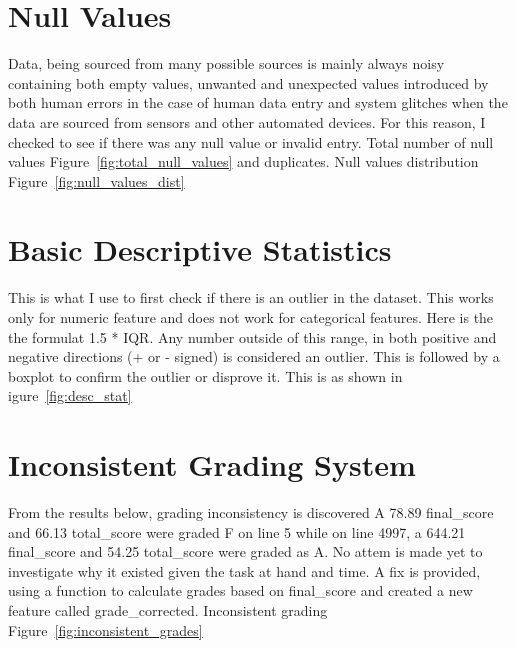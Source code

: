 \section{Null Values}
Data, being sourced from many possible sources is mainly always noisy containing both empty values, unwanted and unexpected values introduced by both human errors in the case of human data entry and system glitches when the data are sourced from sensors and other automated devices. For this reason, I checked to see if there was any null value or invalid entry. Total number of null values Figure~\ref{fig:total_null_values} and duplicates.  Null values distribution Figure~\ref{fig:null_values_dist}

\section{Basic Descriptive Statistics}
This is what I use to first check if there is an outlier in the dataset. This works only for numeric feature and does not work for categorical features. Here is the the formulat 1.5 * IQR. Any number outside of this range, in both positive and negative directions (+ or -  signed) is considered an outlier. This is followed by a boxplot to confirm the outlier or disprove it. This is as shown in igure~\ref{fig:desc_stat}

\section{Inconsistent Grading System}
From the results below, grading inconsistency is discovered A 78.89 final\_score and 66.13 total\_score were graded F on line 5 while on line 4997, a 644.21 final\_score and 54.25 total\_score were graded as A. No attem is made yet to investigate why it existed given the task at hand and time. A fix is provided, using a function to calculate grades based on final\_score and created a new feature called grade\_corrected. Inconsistent grading Figure~\ref{fig:inconsistent_grades}


